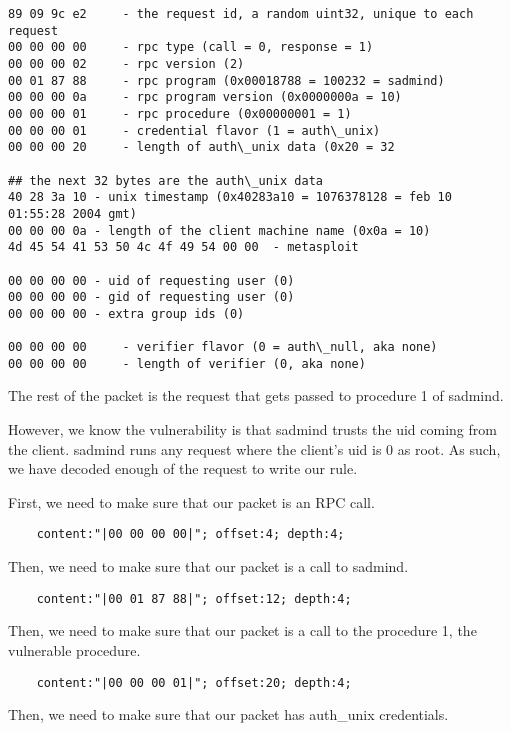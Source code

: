 \documentclass[english]{report}
\begin{document}
\begin{verbatim}
89 09 9c e2     - the request id, a random uint32, unique to each request
00 00 00 00     - rpc type (call = 0, response = 1)
00 00 00 02     - rpc version (2)
00 01 87 88     - rpc program (0x00018788 = 100232 = sadmind)
00 00 00 0a     - rpc program version (0x0000000a = 10)
00 00 00 01     - rpc procedure (0x00000001 = 1)
00 00 00 01     - credential flavor (1 = auth\_unix)
00 00 00 20     - length of auth\_unix data (0x20 = 32

## the next 32 bytes are the auth\_unix data
40 28 3a 10 - unix timestamp (0x40283a10 = 1076378128 = feb 10 01:55:28 2004 gmt)
00 00 00 0a - length of the client machine name (0x0a = 10)
4d 45 54 41 53 50 4c 4f 49 54 00 00  - metasploit

00 00 00 00 - uid of requesting user (0)
00 00 00 00 - gid of requesting user (0)
00 00 00 00 - extra group ids (0)

00 00 00 00     - verifier flavor (0 = auth\_null, aka none)
00 00 00 00     - length of verifier (0, aka none)
\end{verbatim}

The rest of the packet is the request that gets passed to procedure 1 of
sadmind.

However, we know the vulnerability is that sadmind trusts the uid coming from
the client.  sadmind runs any request where the client's uid is 0 as root.  As
such, we have decoded enough of the request to write our rule.  

First, we need to make sure that our packet is an RPC call.
    
\begin{verbatim}
    content:"|00 00 00 00|"; offset:4; depth:4;
\end{verbatim}

Then, we need to make sure that our packet is a call to sadmind.
    
\begin{verbatim}
    content:"|00 01 87 88|"; offset:12; depth:4;
\end{verbatim}

Then, we need to make sure that our packet is a call to the procedure 1, the
vulnerable procedure.  
   
\begin{verbatim}
    content:"|00 00 00 01|"; offset:20; depth:4;
\end{verbatim}

Then, we need to make sure that our packet has auth\_unix credentials.  
    
\end{document}
